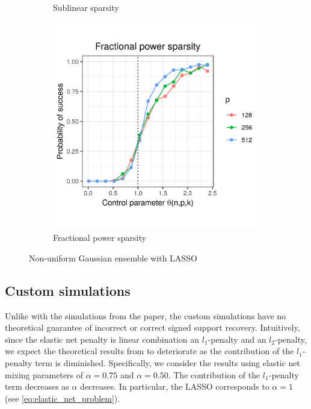 \documentclass[letterpaper,12pt]{article}
\begin{document}
\begin{figure}[h]
\begin{subfigure}{0.32\textwidth}
    \caption{Sublinear sparsity}
    \label{fig:nonuniform_sublinear_sparsity_alpha_1}
  \end{subfigure}
  \begin{subfigure}{0.32\textwidth}
    \includegraphics[width=0.9\linewidth]{nonuniform_fractional_power_sparsity_alpha_1}
    \caption{Fractional power sparsity}
    \label{fig:nonuniform_fractional_power_sparsity_alpha_1}
  \end{subfigure}
  \caption{Non-uniform Gaussian ensemble with LASSO}
  \label{fig:nonuniform_alpha_1}
\end{figure}

\subsection*{Custom simulations}

Unlike with the simulations from the paper, the custom simulations
have no theoretical guarantee of incorrect or correct signed support
recovery. Intuitively, since the elastic net penalty is linear
combination an $l_1$-penalty and an $l_2$-penalty, we expect the
theoretical results from \cite{wainwright06} to deteriorate as the
contribution of the $l_1$-penalty term is diminished. Specifically, we
consider the results using elastic net mixing parameters of
$\alpha = 0.75$ and $\alpha = 0.50$. The contribution of the
$l_1$-penalty term decreases as $\alpha$ decreases. In particular, the
LASSO corresponds to $\alpha = 1$ (see
\eqref{eq:elastic_net_problem}).
\end{document}
